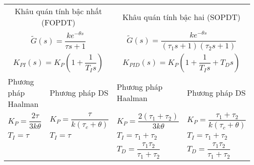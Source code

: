     \begin{table}[htp]
        \begin{center}
            \begin{tabular}{llll}
                \toprule
                \multicolumn{2}{c}{Khâu quán tính bậc nhất (FOPDT)} & \multicolumn{2}{c}{Khâu quán tính bậc hai (SOPDT)} \\
                \multicolumn{2}{c}{$\tilde{G}(s) = \dfrac{k e^{-\theta s}}{\tau s + 1}$} & \multicolumn{2}{c}{$\tilde{G}(s) = \dfrac{k e^{-\theta s}}{\left({\tau_1 s + 1}\right) \left({\tau_2 s + 1}\right)}$} \\
                \multicolumn{2}{c}{$K_{PI}(s) = K_P \left({1 + \dfrac{1}{T_I s}}\right)$} & \multicolumn{2}{c}{$K_{PID}(s) = K_P \left({1 + \dfrac{1}{T_I s} + T_D s}\right)$} \\
                \midrule
                Phương pháp Haalman & Phương pháp DS & Phương pháp Haalman & Phương pháp DS \\
                \midrule
                $K_P = \dfrac{2 \tau}{3 k \theta}$ & $K_P = \dfrac{\tau}{k\left({\tau_c + \theta}\right)}$  & $K_P = \dfrac{2 \left({\tau_1 + \tau_2}\right)}{3 k \theta}$ & $K_P = \dfrac{\tau_1 + \tau_2}{k\left({\tau_c + \theta}\right)}$ \\
                $T_I = \tau$ & $T_I = \tau$ & $T_I = \tau_1 + \tau_2$ & $T_I = \tau_1 + \tau_2$ \\
                & & $T_D = \dfrac{\tau_1 \tau_2}{\tau_1 + \tau_2}$ & $T_D = \dfrac{\tau_1 \tau_2}{\tau_1 + \tau_2}$ \\
                \bottomrule
            \end{tabular}
        \end{center}
    \end{table}
